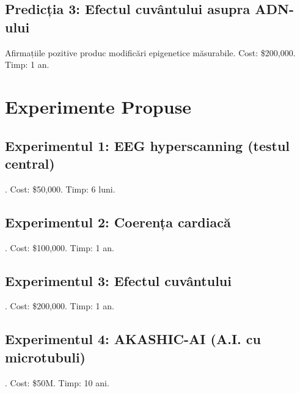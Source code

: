 \documentclass[11pt,a4paper]{article}
\begin{document}
\subsection{Predicția 3: Efectul cuvântului asupra ADN-ului}
Afirmațiile pozitive produc modificări epigenetice măsurabile. Cost: \$200,000. Timp: 1 an.

\section{Experimente Propuse}
\subsection{Experimentul 1: EEG hyperscanning (testul central)}. Cost: \$50,000. Timp: 6 luni.
\subsection{Experimentul 2: Coerența cardiacă}. Cost: \$100,000. Timp: 1 an.
\subsection{Experimentul 3: Efectul cuvântului}. Cost: \$200,000. Timp: 1 an.
\subsection{Experimentul 4: AKASHIC-AI (A.I. cu microtubuli)}. Cost: \$50M. Timp: 10 ani.
\end{document}
